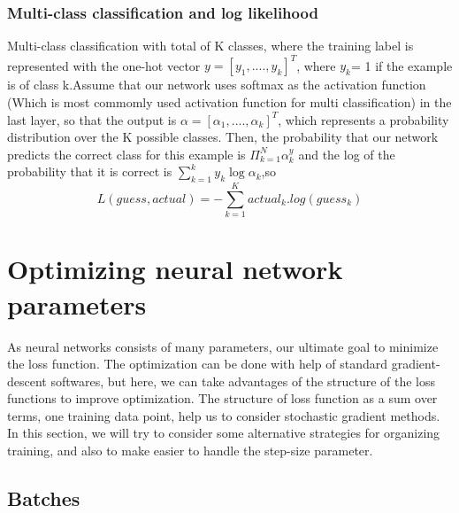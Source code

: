 \subsubsection{Multi-class classification and log likelihood}
Multi-class classification with total of K classes, where the training label is represented with the one-hot vector $y = [y_1,...., y_k]^T$, where $y_k$= 1 if the example is of class k.Assume that our network uses softmax as the activation function (Which is most commomly used activation function for multi classification) in the last layer, so that the output is
$\alpha = [\alpha_1,....,\alpha_k]^T$, which represents a probability
distribution over the K possible classes. Then, the probability that our network predicts
the correct class for this example is $\Pi_{k=1} ^N \alpha_k ^y$ and the log of the probability that it is correct is $\sum_{k=1} ^k y_k \log \alpha_k$,so
\begin{equation*}
    L(guess, actual) = - \sum_{k=1} ^K actual_k.log(guess_k)
\end{equation*}





\section{Optimizing neural network parameters}
As neural networks consists of many parameters, our ultimate goal to minimize the loss function. The optimization can be done with help of standard gradient-descent softwares, but here, we can take advantages of the structure of the loss functions to improve optimization. The structure of loss function as a sum over terms, one training data point, help us to consider stochastic gradient methods. In this section, we will try to consider some alternative strategies for organizing training, and also to make easier to handle the step-size parameter\cite{8285338}.\\


\subsection{Batches}

